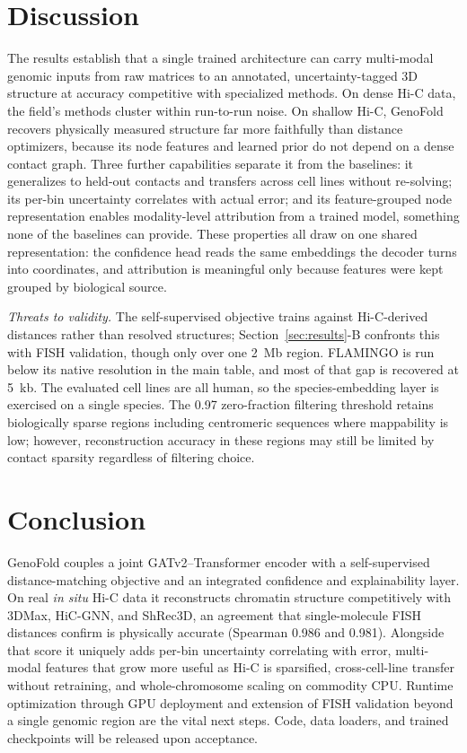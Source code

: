 \documentclass[conference]{IEEEtran}
\begin{document}
\section{Discussion}

The results establish that a single trained architecture can carry
multi-modal genomic inputs from raw matrices to an annotated,
uncertainty-tagged 3D structure at accuracy competitive with specialized
methods. On dense Hi-C data, the field's methods cluster within
run-to-run noise. On shallow Hi-C, GenoFold recovers physically measured
structure far more faithfully than distance optimizers, because its node
features and learned prior do not depend on a dense contact graph. Three
further capabilities separate it from the baselines: it generalizes to
held-out contacts and transfers across cell lines without re-solving;
its per-bin uncertainty correlates with actual error; and its
feature-grouped node representation enables modality-level attribution
from a trained model, something none of the baselines can provide. These
properties all draw on one shared representation: the confidence head
reads the same embeddings the decoder turns into coordinates, and
attribution is meaningful only because features were kept grouped by
biological source.

\textit{Threats to validity.} The self-supervised objective trains
against Hi-C-derived distances rather than resolved structures;
Section~\ref{sec:results}-B confronts this with FISH validation, though
only over one 2~Mb region. FLAMINGO is run below its native resolution
in the main table, and most of that gap is recovered at 5~kb. The
evaluated cell lines are all human, so the species-embedding layer is
exercised on a single species. The 0.97 zero-fraction filtering
threshold retains biologically sparse regions including centromeric
sequences where mappability is low; however, reconstruction accuracy in
these regions may still be limited by contact sparsity regardless of
filtering choice.

\section{Conclusion}

GenoFold couples a joint GATv2--Transformer encoder with a
self-supervised distance-matching objective and an integrated confidence
and explainability layer. On real \textit{in situ} Hi-C data it
reconstructs chromatin structure competitively with 3DMax, HiC-GNN, and
ShRec3D, an agreement that single-molecule FISH distances confirm is
physically accurate (Spearman 0.986 and 0.981). Alongside that score it
uniquely adds per-bin uncertainty correlating with error, multi-modal
features that grow more useful as Hi-C is sparsified, cross-cell-line
transfer without retraining, and whole-chromosome scaling on commodity
CPU. Runtime optimization through GPU deployment and extension of FISH
validation beyond a single genomic region are the vital next steps.
Code, data loaders, and trained checkpoints will be released upon
acceptance.

\balance


\end{document}
